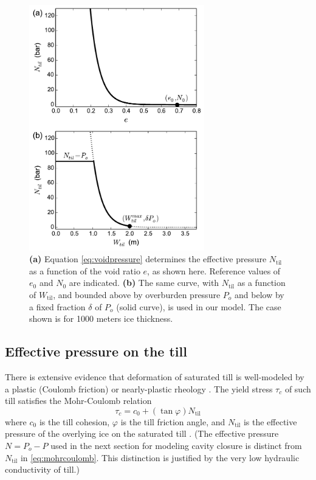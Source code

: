 \documentclass[gmd]{copernicus}   %
\newcommand{\text}{\textrm}
\newcommand{\Ntil}{N_{\text{til}}}
\newcommand{\Wtil}{W_{\text{til}}}
\begin{document}
\begin{figure}[ht]
\includegraphics[width=3.0in,keepaspectratio=true]{Ntilfunctions}
\caption{\textbf{(a)} Equation \eqref{eq:voidpressure} determines the effective pressure $\Ntil$ as a function of the void ratio $e$, as shown here.  Reference values of $e_0$ and $N_0$ are indicated.  \textbf{(b)}  The same curve, with $\Ntil$ as a function of $\Wtil$, and  bounded above by overburden pressure $P_o$ and below by a fixed fraction $\delta$ of $P_o$ (solid curve), is used in our model.  The case shown is for 1000 meters ice thickness.}
\label{fig:Ntilfunctions}
\end{figure}

\subsection{Effective pressure on the till} \label{subsec:effectivepressuretill} There is extensive evidence that deformation of saturated till is well-modeled by a plastic (Coulomb friction) or nearly-plastic rheology \citep{Hookeetal1997,TrufferHarrisonEchelmeyer2000,Tulaczyketal2000,SchoofTill}.  The yield stress $\tau_c$ of such till satisfies the Mohr-Coulomb relation
\begin{equation}
\tau_c = c_0 + (\tan \varphi) \Ntil  \label{eq:mohrcoulomb}
\end{equation}
where $c_0$ is the till cohesion, $\varphi$ is the till friction angle, and $\Ntil$ is the effective pressure of the overlying ice on the saturated till \citep{CuffeyPaterson}.  (The effective pressure $N=P_o-P$ used in the next section for modeling cavity closure is distinct from $\Ntil$ in \eqref{eq:mohrcoulomb}.  This distinction is justified by the very low hydraulic conductivity of till.)
\end{document}
